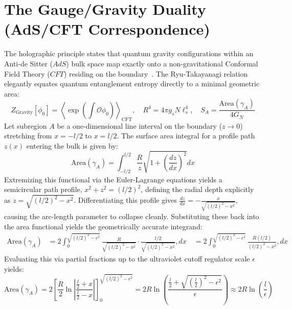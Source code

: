 \documentclass[11pt,a4paper]{article}
\begin{document}
\section{The Gauge/Gravity Duality (AdS/CFT Correspondence)}
The holographic principle states that quantum gravity configurations within an Anti-de Sitter ($AdS$) bulk space map exactly onto a non-gravitational Conformal Field Theory ($CFT$) residing on the boundary~\cite{Maldacena1998}. The Ryu-Takayanagi relation elegantly equates quantum entanglement entropy directly to a minimal geometric area:
\begin{equation}
Z_{\text{Gravity}}[\phi_0] = \left\langle \exp\left(\int \mathcal{O}\phi_0\right) \right\rangle_{\text{CFT}}, \quad R^4 = 4\pi g_s N \ell_s^4, \quad S_A = \frac{\text{Area}(\gamma_A)}{4G_N}
\end{equation}
Let subregion $A$ be a one-dimensional line interval on the boundary ($z \to 0$) stretching from $x = -l/2$ to $x = l/2$. The surface area integral for a profile path $z(x)$ entering the bulk is given by:
\begin{equation}
\text{Area}(\gamma_A) = \int_{-l/2}^{l/2} \frac{R}{z} \sqrt{1 + \left(\frac{dz}{dx}\right)^2} dx
\end{equation}
Extremizing this functional via the Euler-Lagrange equations yields a semicircular path profile, $x^2 + z^2 = (l/2)^2$, defining the radial depth explicitly as $z = \sqrt{(l/2)^2 - x^2}$. Differentiating this profile gives $\frac{dz}{dx} = -\frac{x}{\sqrt{(l/2)^2 - x^2}}$, causing the arc-length parameter to collapse cleanly. Substituting these back into the area functional yields the geometrically accurate integrand:
\begin{equation}
\begin{aligned}
\text{Area}(\gamma_A) &= 2 \int_0^{\sqrt{(l/2)^2 - \epsilon^2}} \frac{R}{\sqrt{(l/2)^2 - x^2}} \cdot \frac{l/2}{\sqrt{(l/2)^2 - x^2}} , dx \
&= 2 \int_0^{\sqrt{(l/2)^2 - \epsilon^2}} \frac{R(l/2)}{(l/2)^2 - x^2} , dx
\end{aligned}
\end{equation}
Evaluating this via partial fractions up to the ultraviolet cutoff regulator scale $\epsilon$ yields:
\begin{equation}
\text{Area}(\gamma_A) = 2 \left[ \frac{R}{2} \ln\left| \frac{\frac{l}{2} + x}{\frac{l}{2} - x} \right| \right]_0^{\sqrt{(l/2)^2 - \epsilon^2}} = 2R \ln\left( \frac{\frac{l}{2} + \sqrt{(\frac{l}{2})^2 - \epsilon^2}}{\epsilon} \right) \approx 2R \ln\left( \frac{l}{\epsilon} \right)
\end{equation}
\end{document}
